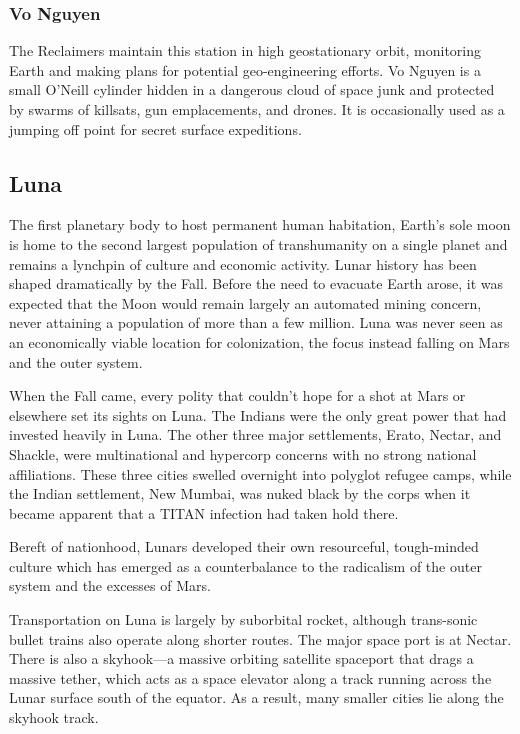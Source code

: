 \subsubsection{Vo Nguyen}

The Reclaimers maintain this station in high geostationary orbit, monitoring Earth and making plans 
for potential geo-engineering efforts. Vo Nguyen is a 
small O'Neill cylinder hidden in a dangerous cloud of 
space junk and protected by swarms of killsats, gun 
emplacements, and drones. It is occasionally used as a 
jumping off point for secret surface expeditions.

\subsection{Luna}

The first planetary body to host permanent human 
habitation, Earth's sole moon is home to the second 
largest population of transhumanity on a single 
planet and remains a lynchpin of culture and economic activity. Lunar history has been shaped dramatically by the Fall. Before the need to evacuate Earth 
arose, it was expected that the Moon would remain 
largely an automated mining concern, never attaining a population of more than a few million. Luna 
was never seen as an economically viable location for 
colonization, the focus instead falling on Mars and 
the outer system.

When the Fall came, every polity that couldn't 
hope for a shot at Mars or elsewhere set its sights 
on Luna. The Indians were the only great power that 
had invested heavily in Luna. The other three major 
settlements, Erato, Nectar, and Shackle, were multinational and hypercorp concerns with no strong national affiliations. These three cities swelled overnight 
into polyglot refugee camps, while the Indian settlement, New Mumbai, was nuked black by the corps 
when it became apparent that a TITAN infection had 
taken hold there.

Bereft of nationhood, Lunars developed their own 
resourceful, tough-minded culture which has emerged 
as a counterbalance to the radicalism of the outer 
system and the excesses of Mars.

Transportation on Luna is largely by suborbital 
rocket, although trans-sonic bullet trains also operate along shorter routes. The major space port is at 
Nectar. There is also a skyhook—a massive orbiting 
satellite spaceport that drags a massive tether, which 
acts as a space elevator along a track running across 
the Lunar surface south of the equator. As a result, 
many smaller cities lie along the skyhook track.

